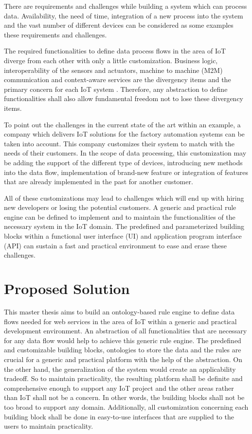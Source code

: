 There are requirements and challenges while building a system which can process data. Availability, the need of time, integration of a new process into the system and the vast number of different devices can be considered as some examples these requirements and challenges.

The required functionalities to define data process flows in the area of IoT diverge from each other with only a little customization. Business logic, interoperability of the sensors and actuators, machine to machine (M2M) communication and context-aware services are the divergency items and the primary concern for each IoT system \cite{6651222}. Therefore, any abstraction to define functionalities shall also allow fundamental freedom not to lose these divergency items.

To point out the challenges in the current state of the art within an example, a company which delivers IoT solutions for the factory automation systems can be taken into account. This company customizes their system to match with the needs of their customers. In the scope of data processing, this customization may be adding the support of the different type of devices, introducing new methods into the data flow, implementation of brand-new feature or integration of features that are already implemented in the past for another customer.

All of these customizations may lead to challenges which will end up with hiring new developers or losing the potential customers. A generic and practical rule engine can be defined to implement and to maintain the functionalities of the necessary system in the IoT domain. The predefined and parameterized building blocks within a functional user interface (UI) and application program interface (API) can sustain a fast and practical environment to ease and erase these challenges.

\section{Proposed Solution}

This master thesis aims to build an ontology-based rule engine to define data flows needed for web services in the area of IoT within a generic and practical development environment. An abstraction of all functionalities that are necessary for any data flow would help to achieve this generic rule engine. The predefined and customizable building blocks, ontologies to store the data and the rules are crucial for a generic and practical platform with the help of the abstraction. On the other hand, the generalization of the system would create an applicability tradeoff. So to maintain practicality, the resulting platform shall be definite and comprehensive enough to support any IoT project and the other areas rather than IoT shall not be a concern. In other words, the building blocks shall not be too broad to support any domain. Additionally, all customization concerning each building block shall be done in easy-to-use interfaces that are supplied to the users to maintain practicality. 

